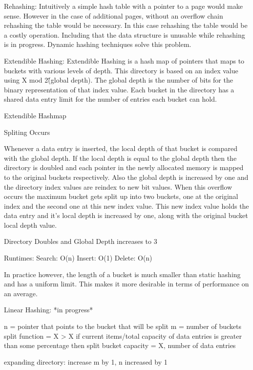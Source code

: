 \documentclass[letterpaper, 12pt]{article}
\renewcommand{\includegraphics}[2][]{\fbox{}}
\begin{document}
Rehashing:
Intuitively a simple hash table with a pointer to a page would make sense. However in the case of additional pages, without an overflow chain rehashing the table would be necessary. In this case rehashing the table would be a costly operation. Including that the data structure is unusable while rehashing is in progress. Dynamic hashing techniques solve this problem.

Extendible Hashing:
Extendible Hashing is a hash map of pointers that maps to buckets with various levels of depth. This directory 
is based on an index value using X mod 2\^(global depth). The global depth is the number of bits for the binary
representation of that index value. Each bucket in the directory has a shared data entry limit for the number of 
entries each bucket can hold.

Extendible Hashmap

Spliting Occurs

Whenever a data entry is inserted, the local depth of that bucket is compared with the global depth. If the local depth
is equal to the global depth then the directory is doubled and each pointer in the newly allocated memory is mapped to the
original buckets respectively. Also the global depth is increased by one and the directory index values are reindex to new
bit values. When this overflow occurs the maximum bucket gets split up into two buckets, one at the original index and the 
second one at this new index value. This new index value holds the data entry and it's local depth is increased by one, along with
the original bucket local depth value.

Directory Doubles and Global Depth increases to 3

Runtimes:
Search: O(n)
Insert: O(1)
Delete: O(n)

In practice however, the length of a bucket is much smaller than static hashing and has a uniform limit. This makes it more desirable
in terms of performance on an average.

Linear Hashing: *in progress*

n = pointer that points to the bucket that will be split
m = number of buckets
split function = X > X if current items/total capacity of data entries is greater than some percentage then split
bucket capacity = X, number of data entries

expanding directory:
increase m by 1, n increased by 1
\end{document}

